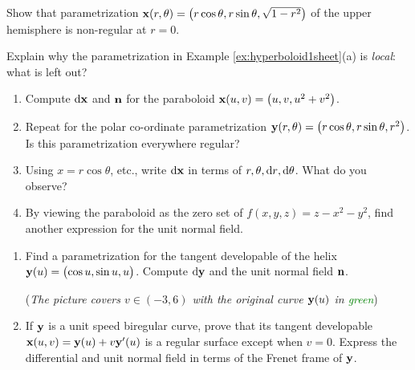 \begin{exercises}
	\exstart Show that parametrization ${\mathbf{x}}(r,\theta)=\bigl(r\cos\theta,r\sin\theta,\sqrt{1-r^2}\bigr)$ of the upper hemisphere is non-regular at $r=0$.

	\begin{enumerate}\setcounter{enumi}{1}
	  \item Explain why the parametrization in Example \ref{ex:hyperboloid1sheet}(a) is \emph{local}: what is left out?
	  
	  \item\label{exs:paraboloid}
	  \begin{enumerate}\itemsep0pt
	    \item Compute $\mathrm{d}{\mathbf{x}}$ and ${\mathbf{n}}$ for the paraboloid ${\mathbf{x}}(u,v)=\bigl(u,v,u^2+v^2\bigr)$.
	  	\item Repeat for the polar co-ordinate parametrization ${\mathbf{y}}(r,\theta)=\bigl(r\cos\theta,r\sin\theta,r^2\bigr)$. Is this parametrization everywhere regular?
			\item Using $x=r\cos\theta$, etc., write $\mathrm{d}{\mathbf{x}}$ in terms of $r,\theta,{\mathrm{d} r},{\mathrm{d}\theta}$. What do you observe?
			\item By viewing the paraboloid as the zero set of $f(x,y,z)=z-x^2-y^2$, find another expression for the unit normal field.
		\end{enumerate}
	
	  \begin{minipage}[t]{0.77\linewidth}\vspace{-2pt}
			\item\label{exs:tandev}
			\begin{enumerate}\itemsep0pt
			  \item Find a parametrization for the tangent developable of the helix ${\mathbf{y}}(u)=\bigl(\cos u,\sin u,u\bigr)$. Compute $\mathrm{d}{\mathbf{y}}$ and the unit normal field ${\mathbf{n}}$.\par
	    (\emph{The picture covers $v\in(-3,6)$ with the original curve ${\mathbf{y}}(u)$ in \textcolor{Green}{green}})
	    	\item If ${\mathbf{y}}$ is a unit speed biregular curve, prove that its tangent developable ${\mathbf{x}}(u,v)={\mathbf{y}}(u)+v{\mathbf{y}}'(u)$ is a regular surface except when $v=0$. Express the differential and unit normal field in terms of the Frenet frame of ${\mathbf{y}}$.
	    \end{enumerate}
	  
	  	\smallskip
	    	

\end{minipage}
\end{enumerate}
\end{exercises}
